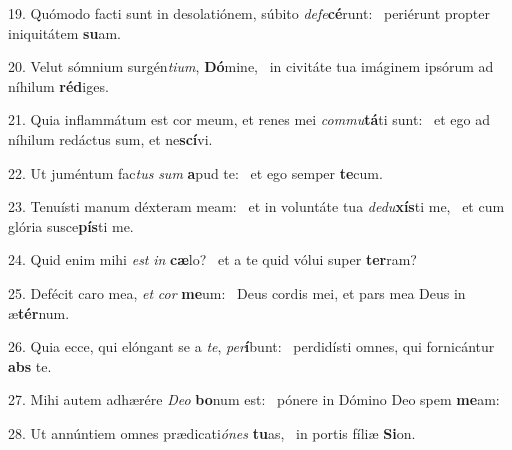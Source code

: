 19. Quómodo facti sunt in desolatiónem, súbito \textit{de}\textit{fe}\textbf{cé}runt: \ast\  periérunt propter iniquitátem \textbf{su}am.\

20. Velut sómnium surgén\textit{ti}\textit{um}, \textbf{Dó}mine, \ast\  in civitáte tua imáginem ipsórum ad níhilum \textbf{réd}iges.\

21. Quia inflammátum est cor meum, et renes mei \textit{com}\textit{mu}\textbf{tá}ti sunt: \ast\  et ego ad níhilum redáctus sum, et ne\textbf{scí}vi.\

22. Ut juméntum fac\textit{tus} \textit{sum} \textbf{a}pud te: \ast\  et ego semper \textbf{te}cum.\

23. Tenuísti manum déxteram meam: \dag\  et in voluntáte tua \textit{de}\textit{du}\textbf{xís}ti me, \ast\  et cum glória susce\textbf{pís}ti me.\

24. Quid enim mihi \textit{est} \textit{in} \textbf{cæ}lo? \ast\  et a te quid vólui super \textbf{ter}ram?\

25. Defécit caro mea, \textit{et} \textit{cor} \textbf{me}um: \ast\  Deus cordis mei, et pars mea Deus in æ\textbf{tér}num.\

26. Quia ecce, qui elóngant se a \textit{te}, \textit{per}\textbf{í}bunt: \ast\  perdidísti omnes, qui fornicántur \textbf{abs} te.\

27. Mihi autem adhærére \textit{De}\textit{o} \textbf{bo}num est: \ast\  pónere in Dómino Deo spem \textbf{me}am:\

28. Ut annúntiem omnes prædicati\textit{ó}\textit{nes} \textbf{tu}as, \ast\  in portis fíliæ \textbf{Si}on.\

